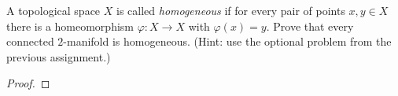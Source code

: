\newpage
\begin{problem}[B]
A topological space $X$ is called \emph{homogeneous} if for every pair of
points $x,y\in X$ there is a homeomorphism $\varphi\colon X\to X$ with
$\varphi(x)=y$. Prove that every connected $2$-manifold is
homogeneous. (Hint: use the optional problem from the previous assignment.)
\end{problem}
\begin{proof}
\end{proof}

